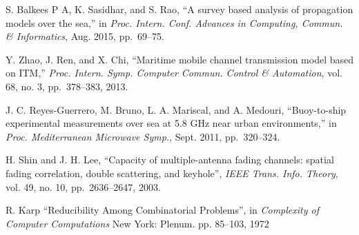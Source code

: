\documentclass[journal]{IEEEtran}
\begin{document}
\begin{thebibliography}{10}
 S. Balkees P A, K. Sasidhar, and S. Rao, ``A survey based analysis of propagation models over the sea,'' in
 \emph{Proc. Intern. Conf. Advances in Computing, Commun. \& Informatics}, Aug. 2015, pp.~69--75.
 
 Y. Zhao, J. Ren, and X. Chi, ``Maritime mobile channel transmission model based on ITM,''
 \emph{Proc. Intern. Symp. Computer Commun. Control \& Automation}, vol. 68, no. 3, pp.~378--383, 2013.
 
 J. C. Reyes-Guerrero, M. Bruno, L. A. Mariscal, and A. Medouri, ``Buoy-to-ship experimental measurements over sea at 5.8 GHz near urban environments,'' in
 \emph{Proc. Mediterranean Microwave Symp.}, Sept. 2011, pp.~320--324.
 
 
 
  H. Shin and J. H. Lee, ``Capacity of multiple-antenna fading channels: spatial fading correlation, double scattering, and keyhole'',
  \emph{IEEE Trans. Info. Theory}, vol. 49, no. 10, pp.~2636--2647, 2003.
 
 
 
 
  

  R. Karp ``Reducibility Among Combinatorial Problems'', in 
  \emph{Complexity of Computer Computations} New York: Plenum. pp. 85–103, 1972
  
 \end{thebibliography}
 
 
 
\end{document}
